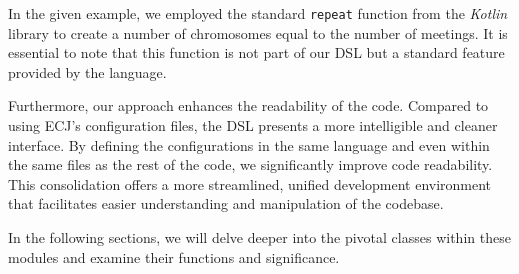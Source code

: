     In the given example, we employed the standard \texttt{repeat} function 
    from the \textit{Kotlin} library to create a number of chromosomes equal to 
    the number of meetings.
    It is essential to note that this function is not part of our DSL but a 
    standard feature provided by the language.

    Furthermore, our approach enhances the readability of the code.
    Compared to using ECJ's configuration files, the DSL presents a more 
    intelligible and cleaner interface.
    By defining the configurations in the same language and even within the 
    same files as the rest of the code, we significantly improve code 
    readability.
    This consolidation offers a more streamlined, unified development 
    environment that facilitates easier understanding and manipulation of the 
    codebase.

    In the following sections, we will delve deeper into the pivotal classes within these modules and examine their functions and significance.
